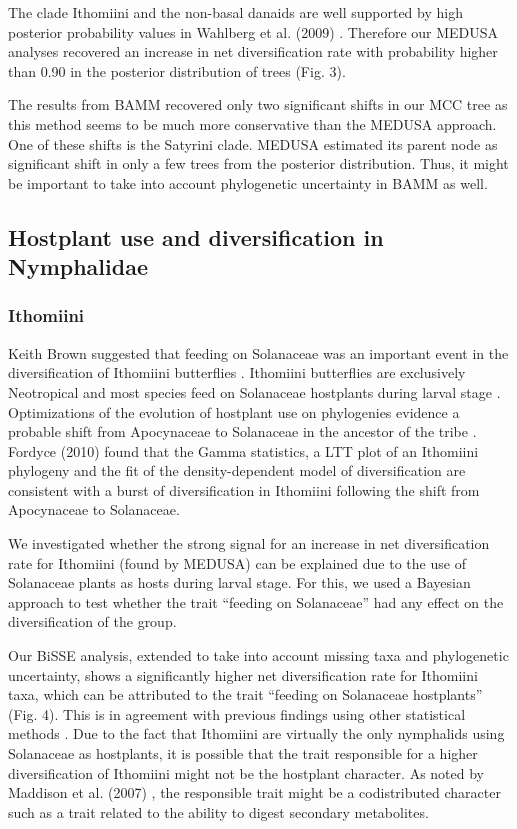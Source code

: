 \documentclass[10pt]{article}
\begin{document}
The clade Ithomiini and the non-basal danaids are well supported by high
posterior probability values in Wahlberg et al. (2009) \cite{wahlberg2009}.
Therefore our MEDUSA analyses recovered an increase in net
diversification rate with probability higher than 0.90 in the posterior
distribution of trees (Fig. 3).

The results from BAMM recovered only two significant shifts in our MCC
tree as this method seems to be much more conservative than the MEDUSA
approach. One of these shifts is the Satyrini clade. MEDUSA estimated
its parent node as significant shift in only a few trees from the
posterior distribution. Thus, it might be important to take into account
phylogenetic uncertainty in BAMM as well.

\subsection*{Hostplant use and diversification in
Nymphalidae}

\subsubsection*{Ithomiini}

Keith Brown suggested that feeding on Solanaceae was an important event
in the diversification of Ithomiini butterflies \cite{brown1987}. Ithomiini
butterflies are exclusively Neotropical and most species feed on
Solanaceae hostplants during larval stage \cite{willmott2006}. Optimizations of the
evolution of hostplant use on phylogenies evidence a probable shift from
Apocynaceae to Solanaceae in the ancestor of the tribe \cite{willmott2006, brower2006}.
Fordyce (2010) \cite{fordyce2010} found that the Gamma statistics, a LTT plot of
an Ithomiini phylogeny and the fit of the density-dependent model of
diversification are consistent with a burst of diversification in
Ithomiini following the shift from Apocynaceae to Solanaceae.

We investigated whether the strong signal for an increase in net
diversification rate for Ithomiini (found by MEDUSA) can be explained
due to the use of Solanaceae plants as hosts during larval stage. For
this, we used a Bayesian approach \cite{fitzjohn2009} to test whether the trait
``feeding on Solanaceae'' had any effect on the diversification of the
group.

Our BiSSE analysis, extended to take into account missing taxa and
phylogenetic uncertainty, shows a significantly higher net
diversification rate for Ithomiini taxa, which can be attributed to the
trait ``feeding on Solanaceae hostplants'' (Fig. 4). This is in
agreement with previous findings using other statistical methods
\cite{fordyce2010}. Due to the fact that Ithomiini are virtually the only
nymphalids using Solanaceae as hostplants, it is possible that the trait
responsible for a higher diversification of Ithomiini might not be the
hostplant character. As noted by Maddison et al. (2007) \cite{maddison2007}, the
responsible trait might be a codistributed character such as a trait
related to the ability to digest secondary metabolites.
\end{document}

